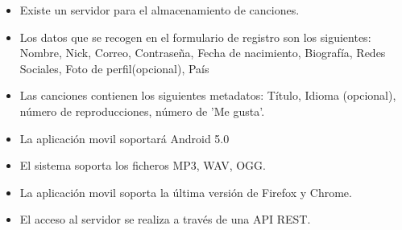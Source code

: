 \begin{itemize}
\item Existe un servidor para el almacenamiento de canciones.
\item Los datos que se recogen en el formulario de registro son los siguientes: Nombre, Nick, Correo, Contraseña, Fecha de nacimiento, Biografía, Redes Sociales, Foto de perfil(opcional), País
\item Las canciones contienen los siguientes metadatos: Título, Idioma (opcional), número de reproducciones, número de 'Me gusta'.
\item La aplicación movil soportará Android 5.0
\item El sistema soporta los ficheros MP3, WAV, OGG.
\item La aplicación movil soporta la última versión de Firefox y Chrome.
\item El acceso al servidor se realiza a través de una API REST.
\end{itemize}

